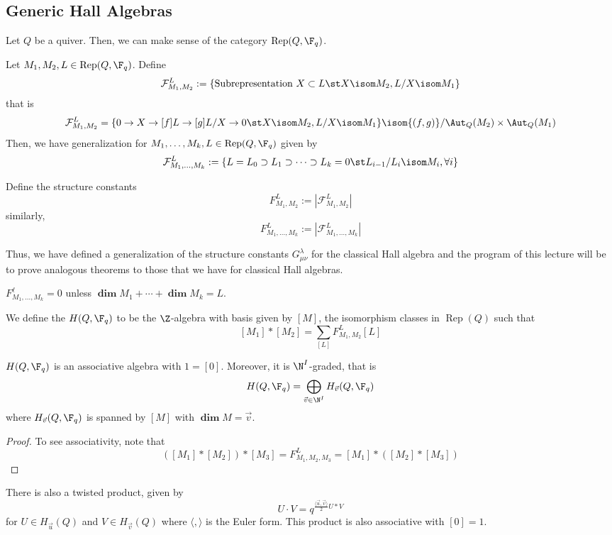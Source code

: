 \documentclass[11pt,leqno,oneside]{amsbook}
\numberwithin{thm}{section}
\newcommand{\Rep}{\operatorname{Rep}} %
\renewcommand{\Q}{Q} %
\newcommand{\grdim}{\boldsymbol{\dim}} %
\newcommand{\cF}{\mathcal{F}} %
\begin{document}
\subsection{Generic Hall Algebras}
Let \(\Q\) be a quiver. Then, we can make sense of the category
\(\Rep(\Q,\F_q)\).
\begin{defn}
  Let \(M_1, M_2, L \in \Rep(\Q,\F_q)\). Define \[
    \cF_{M_1, M_2}^L := \{\text{Subrepresentation }X \subset L \st X
    \isom M_2, L/X \isom M_1\}
  \]
  that is \[
    \cF_{M_1, M_2}^L = \{0 \to X \to[f] L \to[g] L/X \to 0 \st X \isom
    M_2, L/X \isom M_1\} \isom \{(f,g)\}/\Aut_\Q(M_2) \times \Aut_\Q(M_1)
  \]
  Then, we have generalization for \(M_1, \ldots, M_k, L \in
  \Rep(\Q,\F_q)\) given by \[
    \cF_{M_1, \ldots, M_k}^L := \{L = L_0 \supset L_1 \supset \cdots
    \supset L_k = 0 \st L_{i-1}/L_i \isom M_i, \forall i\}
  \]
\end{defn}
\begin{defn}
  Define the structure constants \[
    F_{M_1,M_2}^L := |\cF_{M_1,M_2}^L|
  \]
  similarly, \[
    F_{M_1, \ldots, M_k}^L := | \cF_{M_1, \ldots, M_k}^L |
  \]
\end{defn}
Thus, we have defined a generalization of the structure constants
\(G_{\mu \nu}^\lambda\) for
the classical Hall algebra and the program of this lecture will be to
prove analogous theorems to those that we have for classical Hall
algebras.
\begin{prop}
  \(F_{M_1, \ldots, M_k}^\ell = 0\) unless \(\grdim M_1 + \cdots +
  \grdim M_k = L\). 
\end{prop}
\begin{defn}
  We define the  \(H(\Q,\F_q)\) to be the
  \(\Z\)-algebra with basis given by \([M]\), the isomorphism classes
  in \(\Rep(\Q)\) such that \[
    [M_1] * [M_2] = \sum_{[L]} F_{M_1,M_2}^L [L]
  \]
\end{defn}
\begin{prop}
  \(H(\Q,\F_q)\) is an associative algebra with \(1 = [0]\). Moreover,
  it is \(\N^I\)-graded, that is \[
    H(\Q,\F_q) = \bigoplus_{\vec{v} \in \N^I} H_{\vec{v}} (\Q,\F_q)
  \]
  where \(H_{\vec{v}}(\Q,\F_q)\) is spanned by \([M]\) with \(\grdim M =
  \vec{v}\). 
\end{prop}
\begin{proof}
  To see associativity, note that \[
    ([M_1] * [M_2]) * [M_3] = F_{M_1, M_2, M_3}^L = [M_1]
    * ([M_2] * [M_3])
  \]
\end{proof}
\begin{rmk}\label{def-of-twisted-prod}
  There is also a twisted product, given by \[
    U \cdot V = q^{\frac{\langle \vec{u}, \vec{v} \rangle}{2} U * V}
  \]
   for \(U \in H_{\vec{u}}(\Q)\) and \(V \in H_{\vec{v}}(\Q)\) where
   \(\langle , \rangle\) is the Euler form. This product is also
   associative with \([0]=1\).
\end{rmk}
\end{document}

